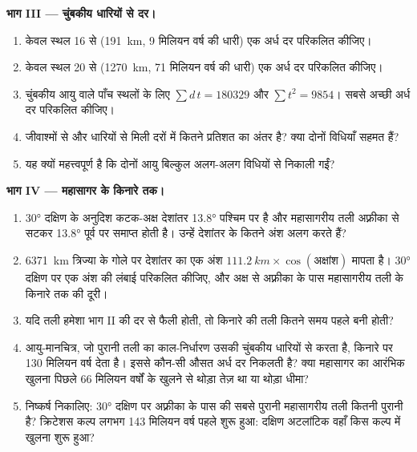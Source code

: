 \begin{problem}[{सप्ताहांत समस्या --- तीन ढंगों से एक महासागर का काल-निर्धारण}]
\medskip
\noindent\textbf{भाग III --- चुंबकीय धारियों से दर।}
\begin{enumerate}[resume]
  \item केवल स्थल 16 से (\qty{191}{km}, 9 मिलियन वर्ष की धारी)
        एक अर्ध दर परिकलित कीजिए।
  \item केवल स्थल 20 से (\qty{1270}{km}, 71 मिलियन वर्ष की धारी)
        एक अर्ध दर परिकलित कीजिए।
  \item चुंबकीय आयु वाले पाँच स्थलों के लिए $\sum d\,t = \num{180329}$ और
        $\sum t^2 = \num{9854}$। सबसे अच्छी अर्ध दर परिकलित कीजिए।
  \item जीवाश्मों से और धारियों से मिली दरों में कितने प्रतिशत का
        अंतर है? क्या दोनों विधियाँ सहमत हैं?
  \item यह क्यों महत्त्वपूर्ण है कि दोनों आयु बिल्कुल
        अलग-अलग विधियों से निकाली गईं?
\end{enumerate}

\medskip
\noindent\textbf{भाग IV --- महासागर के किनारे तक।}
\begin{enumerate}[resume]
  \item \ang{30} दक्षिण के अनुदिश कटक-अक्ष देशांतर
        \ang{13.8} पश्चिम पर है और महासागरीय तली अफ़्रीका से सटकर
        \ang{13.8} पूर्व पर समाप्त होती है। उन्हें देशांतर के कितने अंश अलग करते हैं?
  \item \qty{6371}{km} त्रिज्या के गोले पर देशांतर का एक अंश
        $\qty{111.2}{km} \times \cos(\text{अक्षांश})$ मापता है। \ang{30} दक्षिण पर एक अंश की
        लंबाई परिकलित कीजिए, और अक्ष से अफ़्रीका के पास महासागरीय तली के किनारे तक की
        दूरी।
  \item यदि तली हमेशा भाग II की दर से फैली होती, तो किनारे की तली कितने
        समय पहले बनी होती?
  \item आयु-मानचित्र, जो पुरानी तली का काल-निर्धारण उसकी चुंबकीय धारियों से करता है, किनारे पर
        \num{130} मिलियन वर्ष देता है। इससे कौन-सी औसत अर्ध दर
        निकलती है? क्या महासागर का आरंभिक खुलना पिछले 66 मिलियन वर्षों के खुलने से
        थोड़ा तेज़ था या थोड़ा धीमा?
  \item निष्कर्ष निकालिए: \ang{30} दक्षिण पर अफ़्रीका के पास की सबसे पुरानी महासागरीय तली
        कितनी पुरानी है? क्रिटेशस कल्प लगभग \num{143} मिलियन
        वर्ष पहले शुरू हुआ: दक्षिण अटलांटिक वहाँ किस कल्प में खुलना
        शुरू हुआ?
\end{enumerate}
\end{problem}
